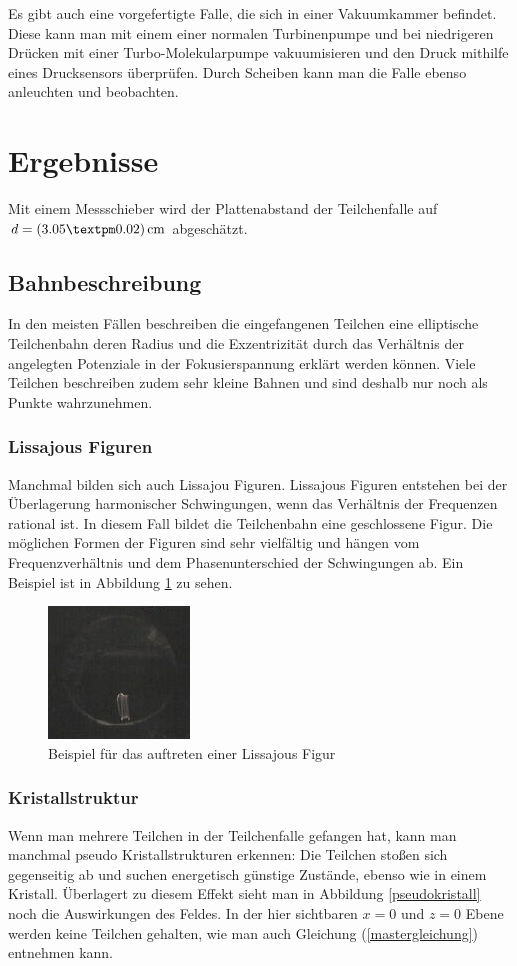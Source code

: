 \documentclass[a4paper,12pt]{article}
\begin{document}
Es gibt auch eine vorgefertigte Falle, die sich in einer Vakuumkammer befindet.
Diese kann man mit einem einer normalen Turbinenpumpe und bei niedrigeren Drücken mit einer Turbo-Molekularpumpe vakuumisieren und den Druck mithilfe eines Drucksensors überprüfen.
Durch Scheiben kann man die Falle ebenso anleuchten und beobachten.



\section{Ergebnisse}
Mit einem Messschieber wird der Plattenabstand der Teilchenfalle auf $d = \unit[(3.05±0.02)]{cm}$ abgeschätzt.
\subsection{Bahnbeschreibung}
In den meisten Fällen beschreiben die eingefangenen Teilchen eine elliptische Teilchenbahn deren Radius und die Exzentrizität durch das Verhältnis der angelegten Potenziale in der Fokusierspannung erklärt werden können.
Viele Teilchen beschreiben zudem sehr kleine Bahnen und sind deshalb nur noch als Punkte wahrzunehmen.

\subsubsection*{Lissajous Figuren}
Manchmal bilden sich auch Lissajou Figuren. Lissajous Figuren entstehen bei der Überlagerung harmonischer Schwingungen, wenn das Verhältnis der Frequenzen rational ist.
In diesem Fall bildet die Teilchenbahn eine geschlossene Figur.
Die möglichen Formen der Figuren sind sehr vielfältig und hängen vom Frequenzverhältnis und dem Phasenunterschied der Schwingungen ab.
Ein Beispiel ist in Abbildung \ref{Lissjous} zu sehen.

\begin{figure}[htb]
		\centering
		\includegraphics{lisa_klein.jpg}
		\caption{Beispiel für das auftreten einer Lissajous Figur}
		\label{Lissjous}
\end{figure}

\subsubsection*{Kristallstruktur}
Wenn man mehrere Teilchen in der Teilchenfalle gefangen hat, kann man manchmal pseudo Kristallstrukturen erkennen:
Die Teilchen stoßen sich gegenseitig ab und suchen energetisch günstige Zustände, ebenso wie in einem Kristall.
Überlagert zu diesem Effekt sieht man in Abbildung \ref{pseudokristall} noch die Auswirkungen des Feldes.
In der hier sichtbaren $x = 0$ und $z = 0$ Ebene werden keine Teilchen gehalten, wie man auch Gleichung (\ref{mastergleichung}) entnehmen kann.
\end{document}
